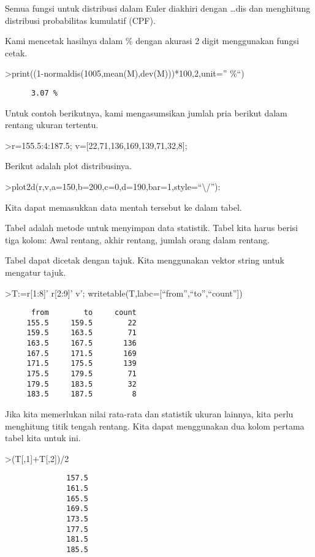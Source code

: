 \documentclass[
]{book}
\begin{document}
Semua fungsi untuk distribusi dalam Euler diakhiri dengan \ldots dis dan menghitung distribusi probabilitas kumulatif (CPF).

Kami mencetak hasilnya dalam \% dengan akurasi 2 digit menggunakan fungsi cetak.

\textgreater print((1-normaldis(1005,mean(M),dev(M)))*100,2,unit='' \%``)

\begin{verbatim}
      3.07 %
\end{verbatim}

Untuk contoh berikutnya, kami mengasumsikan jumlah pria berikut dalam rentang ukuran tertentu.

\textgreater r=155.5:4:187.5; v={[}22,71,136,169,139,71,32,8{]};

Berikut adalah plot distribusinya.

\textgreater plot2d(r,v,a=150,b=200,c=0,d=190,bar=1,style=``\textbackslash/''):

Kita dapat memasukkan data mentah tersebut ke dalam tabel.

Tabel adalah metode untuk menyimpan data statistik. Tabel kita harus berisi tiga kolom: Awal rentang, akhir rentang, jumlah orang dalam rentang.

Tabel dapat dicetak dengan tajuk. Kita menggunakan vektor string untuk mengatur tajuk.

\textgreater T:=r{[}1:8{]}' \textbar{} r{[}2:9{]}' \textbar{} v'; writetable(T,labc={[}``from'',``to'',``count''{]})

\begin{verbatim}
      from        to     count
     155.5     159.5        22
     159.5     163.5        71
     163.5     167.5       136
     167.5     171.5       169
     171.5     175.5       139
     175.5     179.5        71
     179.5     183.5        32
     183.5     187.5         8
\end{verbatim}

Jika kita memerlukan nilai rata-rata dan statistik ukuran lainnya, kita perlu menghitung titik tengah rentang. Kita dapat menggunakan dua kolom pertama tabel kita untuk ini.

\textgreater(T{[},1{]}+T{[},2{]})/2

\begin{verbatim}
              157.5 
              161.5 
              165.5 
              169.5 
              173.5 
              177.5 
              181.5 
              185.5 
\end{verbatim}
\end{document}
